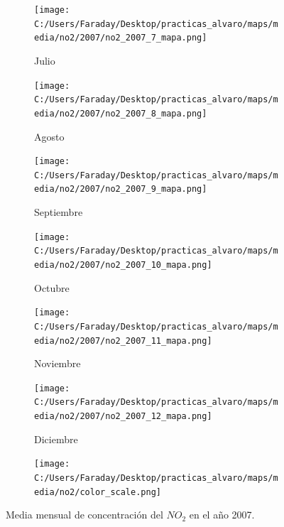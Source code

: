 \documentclass[12pt]{article}
\begin{document}
\begin{figure}[H]
\begin{subfigure}[H]{0.15\textwidth}
\texttt{[image: C:/Users/Faraday/Desktop/practicas\_alvaro/maps/media/no2/2007/no2\_2007\_7\_mapa.png]}
\captionsetup{labelformat=empty}
\caption{Julio}
\label{fig:map-no2-2007-7}
\end{subfigure}
%
\begin{subfigure}[H]{0.15\textwidth}
\texttt{[image: C:/Users/Faraday/Desktop/practicas\_alvaro/maps/media/no2/2007/no2\_2007\_8\_mapa.png]}
\captionsetup{labelformat=empty}
\caption{Agosto}
\label{fig:map-no2-2007-8}
\end{subfigure}
%
\begin{subfigure}[H]{0.15\textwidth}
\texttt{[image: C:/Users/Faraday/Desktop/practicas\_alvaro/maps/media/no2/2007/no2\_2007\_9\_mapa.png]}
\captionsetup{labelformat=empty}
\caption{Septiembre}
\label{fig:map-no2-2007-9}
\end{subfigure}
%
\begin{subfigure}[H]{0.15\textwidth}
\texttt{[image: C:/Users/Faraday/Desktop/practicas\_alvaro/maps/media/no2/2007/no2\_2007\_10\_mapa.png]}
\captionsetup{labelformat=empty}
\caption{Octubre}
\label{fig:map-no2-2007-10}
\end{subfigure}
%
\begin{subfigure}[H]{0.15\textwidth}
\texttt{[image: C:/Users/Faraday/Desktop/practicas\_alvaro/maps/media/no2/2007/no2\_2007\_11\_mapa.png]}
\captionsetup{labelformat=empty}
\caption{Noviembre}
\label{fig:map-no2-2007-11}
\end{subfigure}
%
\begin{subfigure}[H]{0.15\textwidth}
\texttt{[image: C:/Users/Faraday/Desktop/practicas\_alvaro/maps/media/no2/2007/no2\_2007\_12\_mapa.png]}
\captionsetup{labelformat=empty}
\caption{Diciembre}
\label{fig:map-no2-2007-12}
\end{subfigure}

\begin{subfigure}[H]{0.45\textwidth}
\texttt{[image: C:/Users/Faraday/Desktop/practicas\_alvaro/maps/media/no2/color\_scale.png]}
\captionsetup{labelformat=empty}
\caption{}
\end{subfigure}

\vspace*{-7mm}
\caption{Media mensual de concentración del $NO_{2}$ en el año 2007.}
\label{fig:map-no2-2007}
\end{figure}
\end{document}

